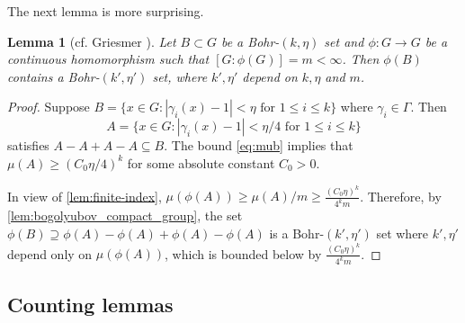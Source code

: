\documentclass[10pt]{article}
\newtheorem{lemma}[lemma]{Lemma}
\theoremstyle{definition}
\newcommand{\R}{\mathbb{R}}
\begin{document}



The next lemma is more surprising.

\begin{lemma}[cf. Griesmer {\cite[Lemma 1.7] {griesmer-br}}] \label{lem:bohr-homo2}
Let $B \subset G$ be a Bohr-$(k, \eta)$ set and $\phi: G \rightarrow G$ be a continuous homomorphism such that $[G:\phi(G)] = m < \infty$. Then $\phi(B)$ contains a Bohr-$(k', \eta')$ set, where $k', \eta'$ depend on $k, \eta$ and $m$.
\end{lemma}

\begin{proof}
Suppose $B = \{x \in G: |\gamma_i(x) - 1| < \eta \text{ for } 1 \leq i \leq k\}$ where $\gamma_i \in \Gamma$. Then 
\[
    A = \{x \in G: |\gamma_i(x) - 1| < \eta/4 \text{ for } 1 \leq i \leq k\}
\]
satisfies $A - A + A - A \subseteq B$. The bound \eqref{eq:mub} implies that $\mu(A) \geq (C_0\eta/4)^k$ for some absolute constant $C_0>0$. 

In view of \cref{lem:finite-index}, $\mu(\phi(A)) \geq \mu(A)/m \geq \frac{(C_0 \eta)^k}{4^k m}$. Therefore, by \cref{lem:bogolyubov_compact_group}, the set $\phi(B) \supseteq \phi(A) - \phi(A) + \phi(A) - \phi(A)$ is a Bohr-$(k', \eta')$ set where $k', \eta'$ depend only on $\mu(\phi(A))$, which is bounded below by $\frac{(C_0 \eta)^k}{4^k m}$.
\end{proof}

\subsection{Counting lemmas} 

\end{document}
